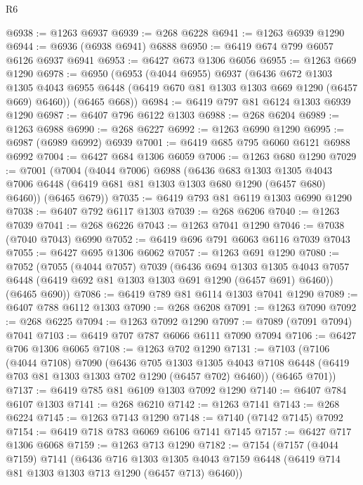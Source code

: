 \begin{lexlean}{R6}
\begin{coremodule}
@6938 := @1263 @6937
@6939 := @268 @6228
@6941 := @1263 @6939 @1290
@6944 := @6936 (@6938 @6941) @6888
@6950 := @6419 @674 @799 @6057 @6126 @6937 @6941
@6953 := @6427 @673 @1306 @6056
@6955 := @1263 @669 @1290
@6978 := @6950
    (@6953
      (@4044 @6955)
      @6937
      (@6436
        @672
        @1303
        @1305
        @4043
        @6955
        @6448
        (@6419 @670 @81 @1303 @1303 @669 @1290 (@6457 @669) @6460))
      (@6465 @668))
@6984 := @6419 @797 @81 @6124 @1303 @6939 @1290
@6987 := @6407 @796 @6122 @1303
@6988 := @268 @6204
@6989 := @1263 @6988
@6990 := @268 @6227
@6992 := @1263 @6990 @1290
@6995 := @6987 (@6989 @6992) @6939
@7001 := @6419 @685 @795 @6060 @6121 @6988 @6992
@7004 := @6427 @684 @1306 @6059
@7006 := @1263 @680 @1290
@7029 := @7001
    (@7004
      (@4044 @7006)
      @6988
      (@6436
        @683
        @1303
        @1305
        @4043
        @7006
        @6448
        (@6419 @681 @81 @1303 @1303 @680 @1290 (@6457 @680) @6460))
      (@6465 @679))
@7035 := @6419 @793 @81 @6119 @1303 @6990 @1290
@7038 := @6407 @792 @6117 @1303
@7039 := @268 @6206
@7040 := @1263 @7039
@7041 := @268 @6226
@7043 := @1263 @7041 @1290
@7046 := @7038 (@7040 @7043) @6990
@7052 := @6419 @696 @791 @6063 @6116 @7039 @7043
@7055 := @6427 @695 @1306 @6062
@7057 := @1263 @691 @1290
@7080 := @7052
    (@7055
      (@4044 @7057)
      @7039
      (@6436
        @694
        @1303
        @1305
        @4043
        @7057
        @6448
        (@6419 @692 @81 @1303 @1303 @691 @1290 (@6457 @691) @6460))
      (@6465 @690))
@7086 := @6419 @789 @81 @6114 @1303 @7041 @1290
@7089 := @6407 @788 @6112 @1303
@7090 := @268 @6208
@7091 := @1263 @7090
@7092 := @268 @6225
@7094 := @1263 @7092 @1290
@7097 := @7089 (@7091 @7094) @7041
@7103 := @6419 @707 @787 @6066 @6111 @7090 @7094
@7106 := @6427 @706 @1306 @6065
@7108 := @1263 @702 @1290
@7131 := @7103
    (@7106
      (@4044 @7108)
      @7090
      (@6436
        @705
        @1303
        @1305
        @4043
        @7108
        @6448
        (@6419 @703 @81 @1303 @1303 @702 @1290 (@6457 @702) @6460))
      (@6465 @701))
@7137 := @6419 @785 @81 @6109 @1303 @7092 @1290
@7140 := @6407 @784 @6107 @1303
@7141 := @268 @6210
@7142 := @1263 @7141
@7143 := @268 @6224
@7145 := @1263 @7143 @1290
@7148 := @7140 (@7142 @7145) @7092
@7154 := @6419 @718 @783 @6069 @6106 @7141 @7145
@7157 := @6427 @717 @1306 @6068
@7159 := @1263 @713 @1290
@7182 := @7154
    (@7157
      (@4044 @7159)
      @7141
      (@6436
        @716
        @1303
        @1305
        @4043
        @7159
        @6448
        (@6419 @714 @81 @1303 @1303 @713 @1290 (@6457 @713) @6460))

\end{coremodule}
\end{lexlean}
